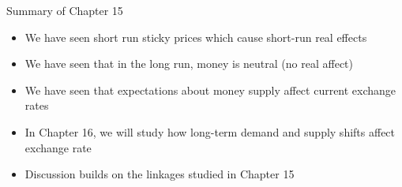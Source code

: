 \documentclass[10pt,hyperref={CJKbookmarks=true},xcolor=dvipsnames,aspectratio=169]{beamer}
\begin{document}


\begin{frame}{Summary of Chapter 15}
\begin{itemize}
\item We have seen short run sticky prices which cause short-run real effects
\item We have seen that in the long run, money is neutral (no real affect)
\item We have seen that expectations about money supply affect current exchange rates
\item In Chapter 16, we will study how long-term demand and supply shifts affect exchange rate
\item Discussion builds on the linkages studied in Chapter 15
\end{itemize}
\end{frame}
\end{document}
